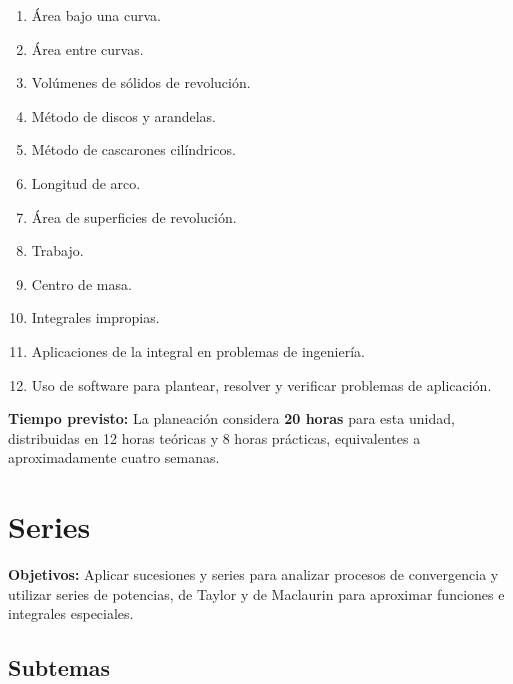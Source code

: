 \documentclass[12pt]{article}
\begin{document}
\begin{enumerate}
    \item Área bajo una curva.
    \item Área entre curvas.
    \item Volúmenes de sólidos de revolución.
    \item Método de discos y arandelas.
    \item Método de cascarones cilíndricos.
    \item Longitud de arco.
    \item Área de superficies de revolución.
    \item Trabajo.
    \item Centro de masa.
    \item Integrales impropias.
    \item Aplicaciones de la integral en problemas de ingeniería.
    \item Uso de software para plantear, resolver y verificar problemas de aplicación.
\end{enumerate}

\textbf{Tiempo previsto:} La planeación considera \textbf{20 horas} para esta unidad, distribuidas en 12 horas teóricas y 8 horas prácticas, equivalentes a aproximadamente cuatro semanas.

\section{Series}

\textbf{Objetivos:} Aplicar sucesiones y series para analizar procesos de convergencia y utilizar series de potencias, de Taylor y de Maclaurin para aproximar funciones e integrales especiales.

\subsection{Subtemas}
\end{document}
